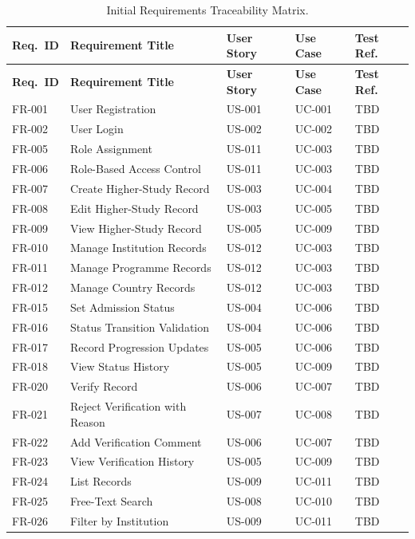 \documentclass[11pt,a4paper]{article}
\begin{document}
\begin{longtable}{@{}p{1.6cm} p{3.4cm} p{2.0cm} p{2.4cm} p{2.4cm}@{}}
\caption{Initial Requirements Traceability Matrix.}
\label{tab:rtm}
\toprule
\textbf{Req.\ ID} & \textbf{Requirement Title} & \textbf{User Story} &
  \textbf{Use Case} & \textbf{Test Ref.} \\
\midrule
\endfirsthead
\toprule
\textbf{Req.\ ID} & \textbf{Requirement Title} & \textbf{User Story} &
  \textbf{Use Case} & \textbf{Test Ref.} \\
\midrule
\endhead
FR-001 & User Registration & US-001 & UC-001 & TBD \\
FR-002 & User Login & US-002 & UC-002 & TBD \\
FR-005 & Role Assignment & US-011 & UC-003 & TBD \\
FR-006 & Role-Based Access Control & US-011 & UC-003 & TBD \\
FR-007 & Create Higher-Study Record & US-003 & UC-004 & TBD \\
FR-008 & Edit Higher-Study Record & US-003 & UC-005 & TBD \\
FR-009 & View Higher-Study Record & US-005 & UC-009 & TBD \\
FR-010 & Manage Institution Records & US-012 & UC-003 & TBD \\
FR-011 & Manage Programme Records & US-012 & UC-003 & TBD \\
FR-012 & Manage Country Records & US-012 & UC-003 & TBD \\
FR-015 & Set Admission Status & US-004 & UC-006 & TBD \\
FR-016 & Status Transition Validation & US-004 & UC-006 & TBD \\
FR-017 & Record Progression Updates & US-005 & UC-006 & TBD \\
FR-018 & View Status History & US-005 & UC-009 & TBD \\
FR-020 & Verify Record & US-006 & UC-007 & TBD \\
FR-021 & Reject Verification with Reason & US-007 & UC-008 & TBD \\
FR-022 & Add Verification Comment & US-006 & UC-007 & TBD \\
FR-023 & View Verification History & US-005 & UC-009 & TBD \\
FR-024 & List Records & US-009 & UC-011 & TBD \\
FR-025 & Free-Text Search & US-008 & UC-010 & TBD \\
FR-026 & Filter by Institution & US-009 & UC-011 & TBD \\

\end{longtable}
\end{document}
